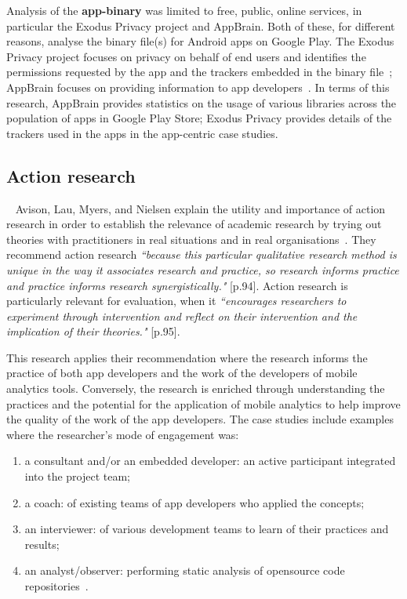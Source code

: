 Analysis of the \textbf{app-binary} was limited to free, public, online services, in particular the Exodus Privacy project and AppBrain. Both of these, for different reasons, analyse the binary file(s) for Android apps on Google Play. The Exodus Privacy project focuses on privacy on behalf of end users and identifies the permissions requested by the app and the trackers embedded in the binary file~; AppBrain focuses on providing information to app developers~. In terms of this research, AppBrain provides statistics on the usage of various libraries across the population of apps in Google Play Store; Exodus Privacy provides details of the trackers used in the apps in the app-centric case studies.


\subsection{Action research}~\label{section-action-research-method}
Avison, Lau, Myers, and Nielsen explain the utility and importance of action research in order to establish the relevance of academic research by trying out theories with practitioners in real situations and in real organisations~. They recommend action research \emph{``because this particular qualitative research method is unique in the way it associates research and practice, so research informs practice and practice informs research synergistically."} [p.94]. Action research is particularly relevant for evaluation, when it \emph{``encourages researchers to experiment through intervention and reflect on their intervention and the implication of their theories."} [p.95]. 

This research applies their recommendation where the research informs the practice of both app developers and the work of the developers of mobile analytics tools. Conversely, the research is enriched through understanding the practices and the potential for the application of mobile analytics to help improve the quality of the work of the app developers. The case studies include examples where the researcher's mode of engagement was:
\begin{enumerate}
    \itemsep0em
    \item a consultant and/or an embedded developer: an active participant integrated into the project team;
    \item a coach: of existing teams of app developers who applied the concepts;
    \item an interviewer: of various development teams to learn of their practices and results;
    \item an analyst/observer: performing static analysis of opensource code repositories~.
\end{enumerate}

